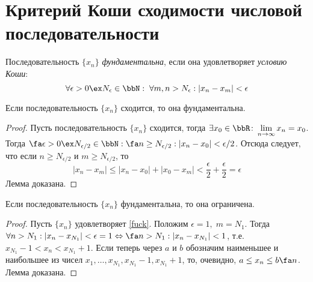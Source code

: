 \section{Критерий Коши сходимости числовой последовательности}

\begin{defn}
Последовательность $\{x_n\}$ \textit{фундаментальна}, если она удовлетворяет \textit{условию Коши}:
\begin{equation}
\label{fuck}
\forall \epsilon >0 \ex N_{\epsilon} \in \bbN: \;\forall m,n > N_{\epsilon}: |x_n-x_m|<\epsilon  
\end{equation}
\end{defn}

\begin{lemm}
\label{lemm1}
Если последовательность $\{x_n\}$ сходится, то она фундаментальна.
\end{lemm}
\begin{proof}
 Пусть последовательность $\{x_n\}$ сходится, тогда $\exists x_{0} \in \bbR\colon  \lim_{n \to \infty}\limits x_n = x_0$. Тогда $\\ \fa \epsilon > 0 \ex N_{\epsilon/2} \in \bbN: \fa n \ge N_{\epsilon/2} : |x_n-x_0|<\epsilon/2$. Отсюда следует, что если $n \ge N_{\epsilon/2}$ и $m \ge N_{\epsilon/2}$, то
$$
|x_n-x_m| \le |x_n-x_0|+|x_0-x_m| <\frac{\epsilon}{2}+\frac{\epsilon}{2}=\epsilon
$$
Лемма доказана.
\end{proof}

\begin{lemm}
\label{lemm2}
Если последовательность $\{x_n\}$ фундаментальна, то она ограничена.
\end{lemm}
\begin{proof}
Пусть $\{x_n\}$ удовлетворяет \eqref{fuck}. Положим $\epsilon = 1,\; m = N_1$. Тогда $\forall n > N_1:\\ |x_n-x_{N_1}| <\epsilon = 1 \Leftrightarrow \fa n > N_1: |x_n - x_{N_1}| < 1$, т.е. $x_{N_1} - 1< x_n < x_{N_1}+1$. Если теперь через $a$ и $b$ обозначим наименьшее и наибольшее из чисел $x_1,\dots,x_{N_1},x_{N_1}-1,x_{N_1}+1$, то, очевидно, $a \le x_n \le b \fa n$.
Лемма доказана.
\end{proof}

